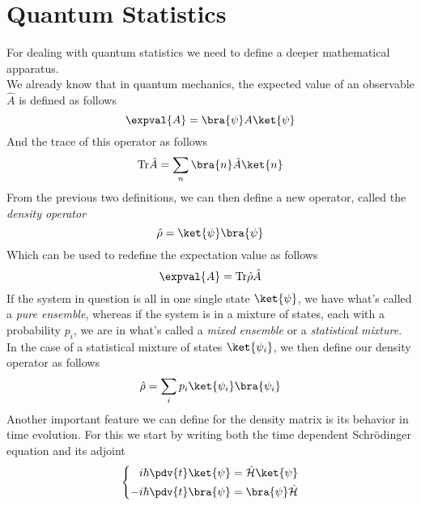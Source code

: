\documentclass[a4paper, 11pt]{book}
\renewcommand{\trace}{\mathrm{Tr}}
\newcommand{\1}{\opr{\mathds{1}}}
\newcommand{\ham}{\mathcal{H}}
\newcommand{\opr}[1]{\hat{#1}}
\theoremstyle{plain}
\begin{document}
		\section{Quantum Statistics}
		For dealing with quantum statistics we need to define a deeper mathematical apparatus.\\
		We already know that in quantum mechanics, the expected value of an observable $\opr{A}$ is defined as follows
		\begin{equation*}
			\expval{A}=\bra{\psi}A\ket{\psi}
		\end{equation*}
		And the trace of this operator as follows
		\begin{equation}
			\trace{\opr{A}}=\sum_n\bra{n}\opr{A}\ket{n}
			\label{eq:traceqm}
		\end{equation}
		From the previous two definitions, we can then define a new operator, called the \textit{density operator}
		\begin{equation}
			\opr{\rho}=\ket{\psi}\bra{\psi}
			\label{eq:densityoperatordefinition}
		\end{equation}
		Which can be used to redefine the expectation value as follows
		\begin{equation}
			\expval{A}=\trace{\opr{\rho}\opr{A}}
			\label{eq:expectationvaluerhooperator}
		\end{equation}
		If the system in question is all in one single state $\ket{\psi}$, we have what's called a \textit{pure ensemble}, whereas if the system is in a mixture of states, each with a probability $p_i$, we are in what's called a \textit{mixed ensemble} or a \textit{statistical mixture}.\\
		In the case of a statistical mixture of states $\ket{\psi_i}$, we then define our density operator as follows
		\begin{equation}
			\opr{\rho}=\sum_ip_i\ket{\psi_i}\bra{\psi_i}
			\label{eq:mixeddensitymatrix}
		\end{equation}
		Another important feature we can define for the density matrix is its behavior in time evolution. For this we start by writing both the time dependent Schrödinger equation and its adjoint
		\begin{equation}
			\left\{\begin{aligned}
					i\hbar\pdv{t}\ket{\psi}&=\opr{\ham}\ket{\psi}\\
					-i\hbar\pdv{t}\bra{\psi}&=\bra{\psi}\opr{\ham}
			\end{aligned}\right.
			\label{eq:schrodingervonneumann}
		\end{equation}
\end{document}
